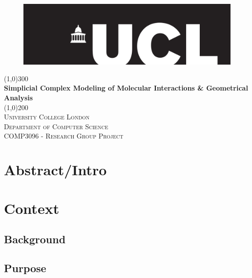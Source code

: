 \documentclass[12pt]{article}
\begin{document}
\begin{titlepage}
\begin{center}
\begin{figure}[t]
\hspace*{0.35cm}\includegraphics[width=1.0\textwidth]{uclLogo}\\
\end{figure}
\line(1,0){300}\\
[0.25in]
\huge{\bfseries Simplicial Complex Modeling of Molecular Interactions \& Geometrical Analysis}\\
[2mm]
\line(1,0){200}\\
[1.5cm]
\textsc{\LARGE University College London}\\
\textsc{\normalsize Department of Computer Science}\\
\textsc{\normalsize COMP3096 - Research Group Project}\\
[5cm]
\end{center}

\end{titlepage}
\tableofcontents

\newpage
\section{Abstract/Intro}\label{sec:abstract/intro}


\newpage
\section{Context}\label{sec:context}

\subsection{Background}

\subsection{Purpose}\label{sec:purpose}

\par
\end{document}
